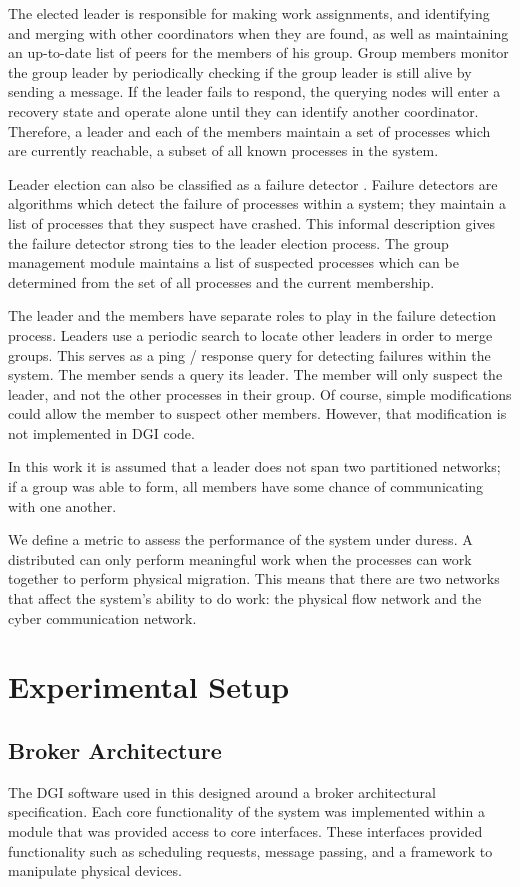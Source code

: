 The elected leader is responsible for making work assignments, and identifying and merging with other coordinators when they are found, as well as maintaining an up-to-date list of peers for the members of his group. 
Group members monitor the group leader by periodically checking if the group leader is still alive by sending a message. 
If the leader fails to respond, the querying nodes will enter a recovery state and operate alone until
they can identify another coordinator.
Therefore, a leader and each of the members maintain a set of processes which are currently reachable, a subset of all known processes in the system.

Leader election can also be classified as a failure detector \cite{LEADERELECTIONEVAL}.
Failure detectors are algorithms which detect the failure of processes within a system; they maintain a list of processes that they suspect have crashed.
This informal description gives the failure detector strong ties to the leader election process. 
The group management module maintains a list of suspected processes which can be determined from the set of all processes and the current membership.

The leader and the members have separate roles to play in the failure detection process.
Leaders use a periodic search to locate other leaders in order to merge groups.
This serves as a ping / response query for detecting failures within the system.
The member sends a query its leader.
The member will only suspect the leader, and not the other processes in their group.
Of course, simple modifications could allow the member to suspect other members.
However, that modification is not implemented in DGI code.

In this work it is assumed that a leader does not span two partitioned networks; if a group was able to form, all members have some chance of communicating with one another.

We define a metric to assess the performance of the system under duress.
A distributed can only perform meaningful work when the processes can work together to perform physical migration.
This means that there are two networks that affect the system's ability to do work: the physical flow network and the cyber communication network.

\section {Experimental Setup}

\subsection{Broker Architecture}
The DGI software used in this designed around a broker architectural specification.
Each core functionality of the system was implemented within a module that was provided access to core interfaces.
These interfaces provided functionality such as scheduling requests, message passing, and a framework to manipulate physical devices.

